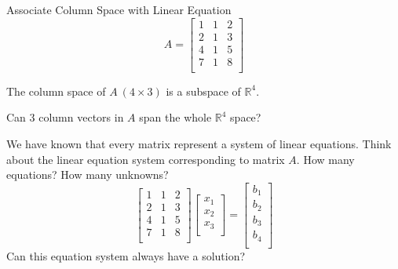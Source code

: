 \documentclass{beamer}
\begin{document}
\begin{frame}{Associate Column Space with Linear Equation}
\begin{equation*}
    A=\left[ \begin{matrix}
        1&		1&		2\\
        2&		1&		3\\
        4&		1&		5\\
        7&		1&		8\\
    \end{matrix} \right]
\end{equation*}

The column space of $A\:(4\times3)$ is a subspace of $\mathbb{R}^4$.

\vspace{3pt}
Can 3 column vectors in $A$ span the whole $\mathbb{R}^4$ space?

\vspace{3pt}
We have known that every matrix represent a system of linear equations. Think about the linear equation system corresponding to matrix $A$. How many equations? How many unknowns?
\begin{equation*}
    \left[ \begin{matrix}
        1&		1&		2\\
        2&		1&		3\\
        4&		1&		5\\
        7&		1&		8\\
    \end{matrix} \right] \left[ \begin{array}{c}
        x_1\\
        x_2\\
        x_3\\
    \end{array} \right] =\left[ \begin{array}{c}
        b_1\\
        b_2\\
        b_3\\
        b_4\\
    \end{array} \right]
\end{equation*}
Can this equation system always have a solution?
\end{frame}
\end{document}
